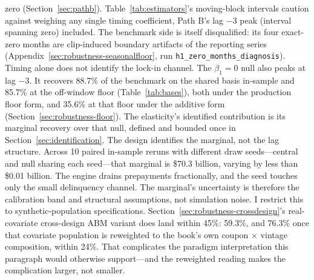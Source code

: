 \documentclass[12pt]{article}
\begin{document}
zero (Section~\ref{sec:pathb}). Table~\ref{tab:estimators}'s moving-block intervals caution against weighing any single timing coefficient, Path B's lag $-3$ peak (interval spanning zero) included. The benchmark side is itself disqualified: its four exact-zero months are clip-induced boundary artifacts of the reporting series (Appendix~\ref{sec:robustness-seasonalfloor}, run \texttt{h1\_zero\_months\_diagnosis}). Timing alone does not identify the lock-in channel. The $\beta_1 = 0$ null also peaks at lag $-3$. It recovers 88.7\% of the benchmark on the shared basis in-sample and 85.7\% at the off-window floor (Table~\ref{tab:bases}), both under the production floor form, and 35.6\% at that floor under the additive form (Section~\ref{sec:robustness-floor}). The elasticity's identified contribution is its marginal recovery over that null, defined and bounded once in Section~\ref{sec:identification}. The design identifies the marginal, not the lag structure. Across 10 paired in-sample reruns with different draw seeds---central and null sharing each seed---that marginal is \$70.3 billion, varying by less than \$0.01 billion. The engine drains prepayments fractionally, and the seed touches only the small delinquency channel. The marginal's uncertainty is therefore the calibration band and structural assumptions, not simulation noise. I restrict this to synthetic-population specifications. Section~\ref{sec:robustness-crossdesign}'s real-covariate cross-design ABM variant does land within 45\%: 59.3\%, and 76.3\% once that covariate population is reweighted to the book's own coupon $\times$ vintage composition, within 24\%. That complicates the paradigm interpretation this paragraph would otherwise support---and the reweighted reading makes the complication larger, not smaller.
\end{document}

